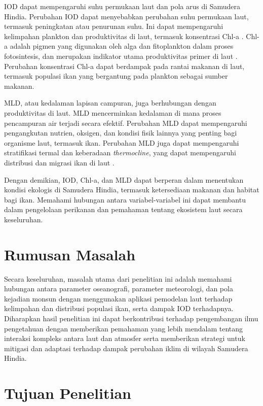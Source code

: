 \begin{spacing}{1.5}
	IOD dapat mempengaruhi suhu permukaan laut dan pola arus di Samudera Hindia. Perubahan IOD dapat menyebabkan perubahan suhu permukaan laut, termasuk peningkatan atau penurunan suhu. Ini dapat mempengaruhi kelimpahan plankton dan produktivitas di laut, termasuk konsentrasi Chl-a \cite{brewin2012influence}. Chl-a adalah pigmen yang digunakan oleh alga dan fitoplankton dalam proses fotosintesis, dan merupakan indikator utama produktivitas primer di laut \cite{huot2007does}. Perubahan konsentrasi Chl-a dapat berdampak pada rantai makanan di laut, termasuk populasi ikan yang bergantung pada plankton sebagai sumber makanan.
	
	MLD, atau kedalaman lapisan campuran, juga berhubungan dengan produktivitas di laut. MLD mencerminkan kedalaman di mana proses pencampuran air terjadi secara efektif. Perubahan MLD dapat mempengaruhi pengangkutan nutrien, oksigen, dan kondisi fisik lainnya yang penting bagi organisme laut, termasuk ikan. Perubahan MLD juga dapat mempengaruhi stratifikasi termal dan keberadaan \textit{thermocline}, yang dapat mempengaruhi distribusi dan migrasi ikan di laut \cite{bernal2017sharing}.
	
	Dengan demikian, IOD, Chl-a, dan MLD dapat berperan dalam menentukan kondisi ekologis di Samudera Hindia, termasuk ketersediaan makanan dan habitat bagi ikan. Memahami hubungan antara variabel-variabel ini dapat membantu dalam pengelolaan perikanan dan pemahaman tentang ekosistem laut secara keseluruhan.
	
	\section[Rumusan Masalah]{Rumusan Masalah}
	Secara keseluruhan, masalah utama dari penelitian ini adalah memahami hubungan antara parameter oseanografi, parameter meteorologi, dan pola kejadian monsun dengan menggunakan aplikasi pemodelan laut terhadap kelimpahan dan distribusi populasi ikan, serta dampak IOD terhadapnya. Diharapkan hasil penelitian ini dapat berkontribusi terhadap pengembangan ilmu pengetahuan dengan memberikan pemahaman yang lebih mendalam tentang interaksi kompleks antara laut dan atmosfer serta memberikan strategi untuk mitigasi dan adaptasi terhadap dampak perubahan iklim di wilayah Samudera Hindia.

	\section[Tujuan Penelitian]{Tujuan Penelitian}
	

\end{spacing}
